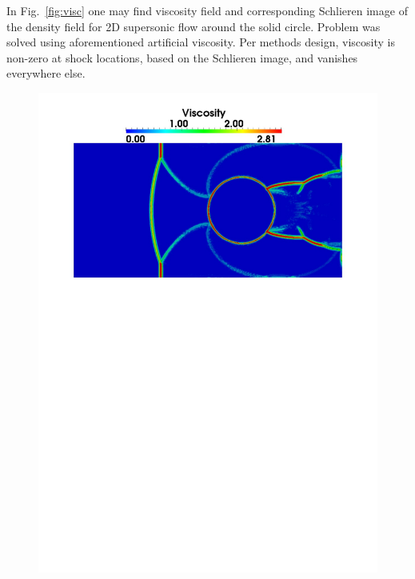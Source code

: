 In Fig.~\ref{fig:visc} one may find viscosity field and corresponding Schlieren image of the density field for 2D supersonic flow around the solid circle. Problem was solved using aforementioned artificial viscosity. Per methods design, viscosity is non-zero at shock locations, based on the Schlieren image, and vanishes everywhere else.
\begin{figure}[h!]
\begin{minipage}{0.5\linewidth}
\includegraphics[scale=0.4]{fig/visc.pdf}\\
\end{minipage}
\begin{minipage}{0.5\linewidth}

\end{minipage}
\end{figure}
